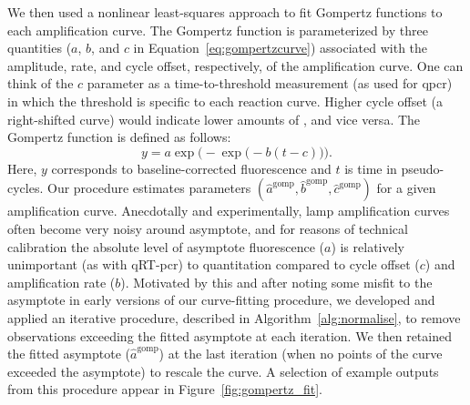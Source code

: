 \documentclass[../thesis.tex]{subfiles}
\begin{document}
We then used a nonlinear least-squares approach to fit Gompertz functions to each amplification curve. The Gompertz function is parameterized by three quantities ($a$, $b$, and $c$ in Equation~\ref{eq:gompertzcurve}) associated with the amplitude, rate, and cycle offset, respectively, of the amplification curve. One can think of the $c$ parameter as a time-to-threshold measurement (as used for \gls{qpcr}) in which the threshold is specific to each reaction curve. Higher cycle offset (a right-shifted curve) would indicate lower amounts of , and vice versa. The Gompertz function is defined as follows:
\begin{equation} \label{eq:gompertzcurve}
    y = a \exp\Big(-\exp\big( -b (t - c)\big)\Big).
\end{equation}
Here, $y$ corresponds to baseline-corrected fluorescence and $t$ is time in pseudo-cycles. Our procedure estimates parameters $(\hat{a}^{\text{gomp}}, \hat{b}^{\text{gomp}}, \hat{c}^{\text{gomp}})$ for a given amplification curve. Anecdotally and experimentally, \gls{lamp} amplification curves often become very noisy around asymptote, and for reasons of technical calibration the absolute level of asymptote fluorescence ($a$) is relatively unimportant (as with qRT-\gls{pcr}) to quantitation compared to cycle offset ($c$) and amplification rate ($b$).
 Motivated by this and after noting some misfit to the asymptote in early versions of our curve-fitting procedure, we developed and applied an iterative procedure, described in Algorithm~\ref{alg:normalise}, to remove observations exceeding the fitted asymptote at each iteration. We then retained the fitted asymptote ($\hat{a}^{\text{gomp}}$) at the last iteration (when no points of the curve exceeded the asymptote) to rescale the curve. A selection of example outputs from this procedure appear in Figure~\ref{fig:gompertz_fit}.
\end{document}
